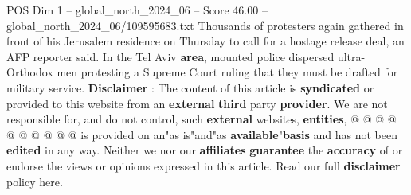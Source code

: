 \begin{textsample}{POS Dim 1 – global\_north\_2024\_06 – Score 46.00 – global\_north\_2024\_06/109595683.txt}
Thousands of protesters again gathered in front of his Jerusalem residence on Thursday to call for a hostage release deal, an AFP reporter said.
In the Tel Aviv \textbf{area}, mounted police dispersed ultra-Orthodox men protesting a Supreme Court ruling that they must be drafted for military service. \textbf{Disclaimer} : The content of this article is \textbf{syndicated} or provided to this website from an \textbf{external} \textbf{third} party \textbf{provider}.
We are not responsible for, and do not control, such \textbf{external} websites, \textbf{entities}, @ @ @ @ @ @ @ @ @ @ is provided on an"as is"and"as \textbf{available}"\textbf{basis} and has not been \textbf{edited} in any way.
Neither we nor our \textbf{affiliates} \textbf{guarantee} the \textbf{accuracy} of or endorse the views or opinions expressed in this article.
Read our full \textbf{disclaimer} policy here.

\end{textsample}
